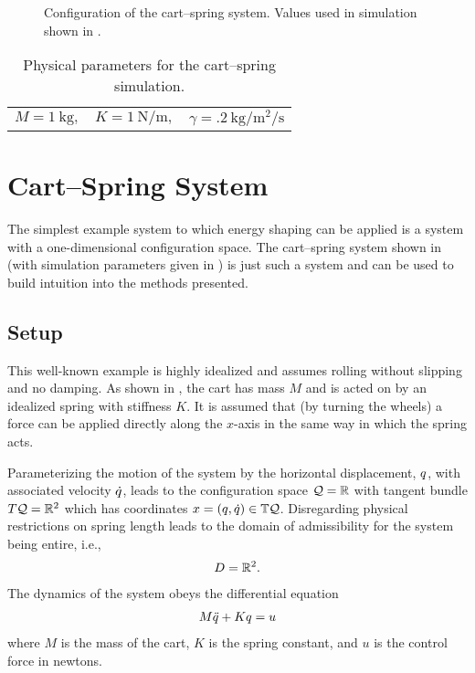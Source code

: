 \begin{figure}[t!]
  \centering
  \def\svgwidth{0.7\columnwidth}
  
  \caption[Configuration of the cart--spring system.]{Configuration of the
    cart--spring system. Values used in simulation shown in .}
  \label{fig:cart-spring-configuration}
\end{figure}

\begin{table}[t!]
  \caption{Physical parameters for the cart--spring simulation.}
  \label{tab:cart_spring_parameters}
  \centering
  \begin{tabular}{c c c}
    $M = 1 \ \mathrm{kg},$ &
    $K = 1 \ \mathrm{N/m},$ &
    $\gamma = .2 \ \mathrm{kg/m^{2}/s}$
  \end{tabular}
  \vspace{-1em}
\end{table}

\section{Cart--Spring System}\label{sec:cart_spring}

The simplest example system to which energy shaping can be applied is a system
with a one-dimensional configuration space.
%
The cart--spring system shown in  (with
simulation parameters given in ) is just such
a system and can be used to build intuition into the methods presented.

\subsection{Setup}

This well-known example is highly idealized and assumes rolling without slipping
and no damping.
%
As shown in , the cart has mass $M$ and is
acted on by an idealized spring with stiffness $K$.
%
It is assumed that (by turning the wheels) a force can be applied directly along
the $x$-axis in the same way in which the spring acts.

%
Parameterizing the motion of the system by the horizontal displacement, $q$, with
associated velocity $\dot{q}$, leads to the configuration space $\mathcal{Q} = \mathbb{R}$ with
tangent bundle $T\mathcal{Q} = \mathbb{R}^{2}$ which has coordinates $x = (q, \dot{q}) \in \mathbb{T}\mathcal{Q}$.
%
Disregarding physical restrictions on spring length leads to the domain of
admissibility for the system being entire, i.e.,
\begin{align*}
  D = \mathbb{R}^{2}.
\end{align*}
%
The dynamics of the system obeys the differential equation
\begin{align*}
  M \ddot{q} + K q = u
\end{align*}
where $M$ is the mass of the cart, $K$ is the spring constant, and $u$ is the
control force in newtons.

